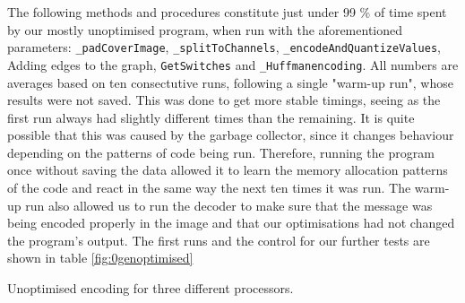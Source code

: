 The following methods and procedures constitute just under 99 \% of time spent by our mostly unoptimised program, when run with the aforementioned parameters:
\lstinline|_padCoverImage|, \lstinline|_splitToChannels|, \lstinline|_encodeAndQuantizeValues|, Adding edges to the graph, \lstinline|GetSwitches| and \lstinline|_Huffmanencoding|.
All numbers are averages based on ten consectutive runs, following a single "warm-up run", whose results were not saved.
This was done to get more stable timings, seeing as the first run always had slightly different times than the remaining.
It is quite possible that this was caused by the garbage collector, since it changes behaviour depending on the patterns of code being run.
Therefore, running the program once without saving the data allowed it to learn the memory allocation patterns of the code and react in the same way the next ten times it was run.
The warm-up run also allowed us to run the decoder to make sure that the message was being encoded properly in the image and that our optimisations had not changed the program's output.
The first runs and the control for our further tests are shown in table \ref{fig:0genoptimised}

\begin{threeparttable}[]
    \centering
    \caption{Unoptimised encoding for three different processors.}
    \label{fig:0genoptimised}
\end{threeparttable}

